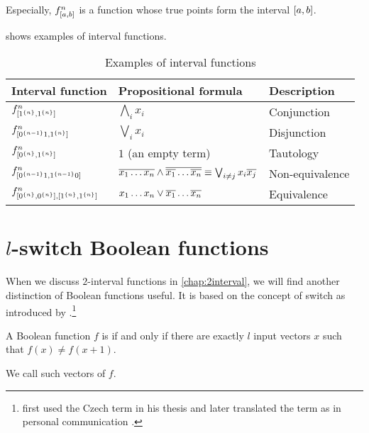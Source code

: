 Especially,
$f^{n}_{[a, b]}$ is a function
whose true points form the interval $[a, b]$.


shows
examples of interval functions.

\begin{table}[h]
\centering
\begin{tabular}{lll}
Interval function & Propositional formula & Description \\
\hline
$f^{n}_{[1^{\{n\}}, 1^{\{n\}}]}$ &
$\bigwedge_i{x_i}$ & Conjunction \\
$f^{n}_{[0^{\{n-1\}} 1, 1^{\{n\}}]}$ &
$\bigvee_i{x_i}$ & Disjunction \\
$f^{n}_{[0^{\{n\}}, 1^{\{n\}}]}$ &
$1$ (an empty term) & Tautology \\
$f^{n}_{[0^{\{n-1\}} 1, 1^{\{n-1\}} 0]}$ &
$\overline{x_1 \ldots x_n} \wedge
\overline{\overline{x_1} \ldots \overline{x_n}}
\equiv \bigvee_{i \neq j}{x_i \overline{x_j}}$ &
Non-equivalence \\
$f^n_{[0^{\{n\}}, 0^{\{n\}}],
[1^{\{n\}}, 1^{\{n\}}]}$ &
$x_1 \ldots x_n \vee \overline{x_1} \ldots \overline{x_n}$ &
Equivalence
\end{tabular}
\caption{Examples of interval functions}
\label{tab:exampleintfns}
\end{table}

\section{\texorpdfstring{$l$}{l}-switch Boolean functions}

When we discuss $2$-interval functions
in \autoref{chap:2interval},
we will find another distinction
of Boolean functions useful.
It is based on the concept of switch
as introduced by \citet{Husek2014,Husek2015}.\footnote{
\citeauthor{Husek2014} first used the Czech term
in his thesis \citep[p.~13]{Husek2014}
and later translated the term as 
in personal communication \citep{Husek2015}.
}

\begin{definition}
A Boolean function $f$ is 
if and only if
there are exactly $l$ input vectors $x$ such that
$f(x) \neq f(x+1)$.

We call such vectors  of $f$.
\end{definition}
